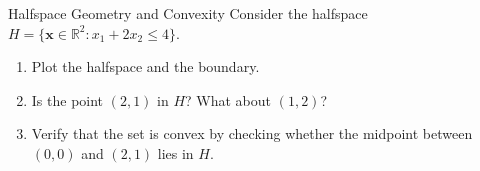\begin{ex}{Halfspace Geometry and Convexity}{}
Consider the halfspace \( H = \{ \mathbf{x} \in \mathbb{R}^2 : x_1 + 2x_2 \leq 4 \} \).
\begin{enumerate}
    \item Plot the halfspace and the boundary.
    \item Is the point \( (2,1) \) in \( H \)? What about \( (1,2) \)?
    \item Verify that the set is convex by checking whether the midpoint between \( (0,0) \) and \( (2,1) \) lies in \( H \).
\end{enumerate}
\end{ex}


